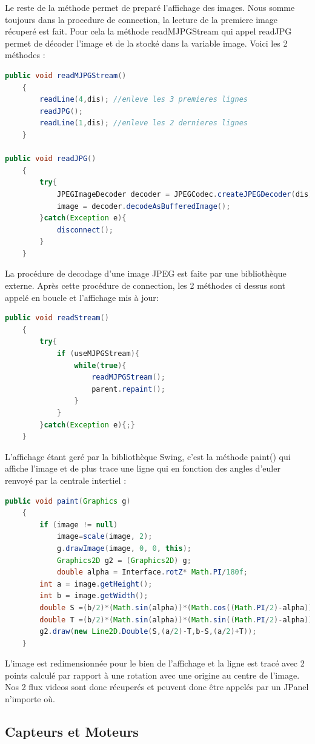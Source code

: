 \documentclass[a4paper,11pt]{report}
\begin{document}
		\newline Le reste de la méthode permet de preparé l'affichage des images.
		\newline Nous somme toujours dans la procedure de connection, la lecture de la premiere image récuperé est fait. Pour cela la méthode readMJPGStream qui appel readJPG permet de décoder l'image et de la stocké dans la variable image. Voici les 2 méthodes :
		\begin{lstlisting}[language=java]
public void readMJPGStream()
	{
		readLine(4,dis); //enleve les 3 premieres lignes
		readJPG();
		readLine(1,dis); //enleve les 2 dernieres lignes
	}
	
public void readJPG()
	{
		try{
			JPEGImageDecoder decoder = JPEGCodec.createJPEGDecoder(dis);
			image = decoder.decodeAsBufferedImage();
		}catch(Exception e){
			disconnect();
		}
	}
		\end{lstlisting}
		La procédure de decodage d'une image JPEG est faite par une bibliothèque externe.
		\newpage Après cette procédure de connection, les 2 méthodes ci dessus sont appelé en boucle et l'affichage mis à jour:
		\begin{lstlisting}[language=java]
public void readStream()
	{
		try{
			if (useMJPGStream){
				while(true){
					readMJPGStream();
					parent.repaint();
				}
			}
    	}catch(Exception e){;}
    }
		\end{lstlisting}
		L'affichage étant geré par la bibliothèque Swing, c'est la méthode paint() qui affiche l'image et de plus trace une ligne qui en fonction des angles d'euler renvoyé par la centrale intertiel :
		\begin{lstlisting}[language=java]
public void paint(Graphics g)
	{
		if (image != null)
			image=scale(image, 2);
			g.drawImage(image, 0, 0, this);
			Graphics2D g2 = (Graphics2D) g;
			double alpha = Interface.rotZ* Math.PI/180f;
    	int a = image.getHeight();
    	int b = image.getWidth();
    	double S =(b/2)*(Math.sin(alpha))*(Math.cos((Math.PI/2)-alpha));
    	double T =(b/2)*(Math.sin(alpha))*(Math.sin((Math.PI/2)-alpha));
    	g2.draw(new Line2D.Double(S,(a/2)-T,b-S,(a/2)+T));
	}
		\end{lstlisting}
	L'image est redimensionnée pour le bien de l'affichage et la ligne est tracé avec 2 points calculé par rapport à une rotation avec une origine au centre de l'image.
	\newline \newline Nos 2 flux videos sont donc récuperés et peuvent donc être appelés par un JPanel n'importe où.
\newpage
		\subsection{Capteurs et Moteurs}
\end{document}
